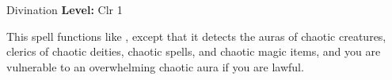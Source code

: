 {Divination}
{
	\textbf{Level:}
	Clr 1\\
}
{
	This spell functions like , except that it detects the auras of chaotic creatures, clerics of chaotic deities, chaotic spells, and chaotic magic items, and you are vulnerable to an overwhelming chaotic aura if you are lawful.

}
